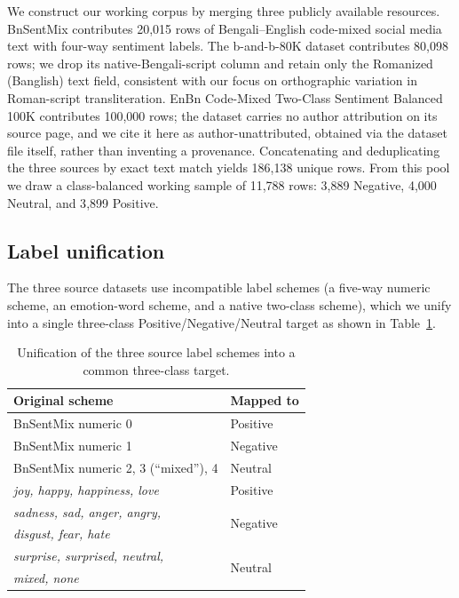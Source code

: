 \documentclass[conference]{IEEEtran}
\begin{document}
We construct our working corpus by merging three publicly available
resources. BnSentMix \citep{alam2025bnsentmix} contributes 20{,}015 rows of
Bengali--English code-mixed social media text with four-way sentiment labels.
The b-and-b-80K dataset \citep{kaggle_bandb80k} contributes 80{,}098 rows; we
drop its native-Bengali-script column and retain only the Romanized (Banglish)
text field, consistent with our focus on orthographic variation in
Roman-script transliteration. EnBn Code-Mixed Two-Class Sentiment Balanced
100K \citep{enbn100k} contributes 100{,}000 rows; the dataset carries no author
attribution on its source page, and we cite it here as author-unattributed,
obtained via the dataset file itself, rather than inventing a provenance.
Concatenating and deduplicating the three sources by exact text match yields
186{,}138 unique rows. From this pool we draw a class-balanced working sample
of 11{,}788 rows: 3{,}889 Negative, 4{,}000 Neutral, and 3{,}899 Positive.

\subsection{Label unification}

The three source datasets use incompatible label schemes (a five-way numeric
scheme, an emotion-word scheme, and a native two-class scheme), which we unify
into a single three-class Positive/Negative/Neutral target as shown in
Table~\ref{tab:label-map}.

\begin{table}[t]
\centering
\caption{Unification of the three source label schemes into a common
three-class target.}
\label{tab:label-map}
\begin{tabular}{ll}
\toprule
\textbf{Original scheme} & \textbf{Mapped to} \\
\midrule
BnSentMix numeric 0 & Positive \\
BnSentMix numeric 1 & Negative \\
BnSentMix numeric 2, 3 (``mixed''), 4 & Neutral \\
\midrule
\emph{joy, happy, happiness, love} & Positive \\
\emph{sadness, sad, anger, angry,} & \multirow{2}{*}{Negative} \\
\emph{disgust, fear, hate} & \\
\emph{surprise, surprised, neutral,} & \multirow{2}{*}{Neutral} \\
\emph{mixed, none} & \\
\bottomrule
\end{tabular}
\end{table}
\end{document}

